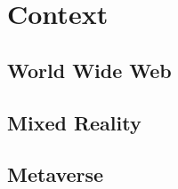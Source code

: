 \section{Context}


\subsection{World Wide Web}



\subsection{Mixed Reality}



\subsection{Metaverse}
